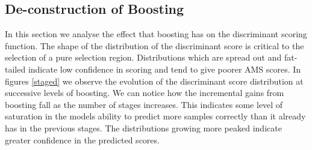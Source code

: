 \subsection{De-construction of Boosting}

In this section we analyse the effect that boosting has on the discriminant scoring function. The shape of the distribution of the discriminant score is critical to the selection of a pure selection region. Distributions which are spread out and fat-tailed indicate low confidence in scoring and tend to give poorer AMS scores. In figures \ref{staged} we observe the evolution of the discriminant score distribution at successive levels of boosting. We can notice how the incremental gains from boosting fall as the number of stages increases. This indicates some level of saturation in the models ability to predict more samples correctly than it already has in the previous stages. The distributions growing more peaked indicate greater confidence in the predicted scores.  
 
